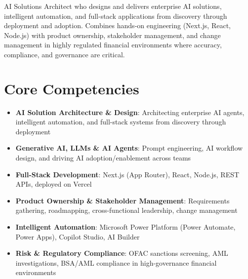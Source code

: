 \documentclass[11pt,a4paper,sans]{moderncv}
\begin{document}
\makecvtitle


\vspace{6pt}
\small{AI Solutions Architect who designs and delivers enterprise AI solutions, intelligent automation, and full-stack applications from discovery through deployment and adoption. Combines hands-on engineering (Next.js, React, Node.js) with product ownership, stakeholder management, and change management in highly regulated financial environments where accuracy, compliance, and governance are critical.}


\section{Core Competencies}
\vspace{1pt}
\begin{itemize}

\item \textbf{AI Solution Architecture \& Design}: Architecting enterprise AI agents, intelligent automation, and full-stack systems from discovery through deployment

\item \textbf{Generative AI, LLMs \& AI Agents}: Prompt engineering, AI workflow design, and driving AI adoption/enablement across teams

\item \textbf{Full-Stack Development}: Next.js (App Router), React, Node.js, REST APIs, deployed on Vercel

\item \textbf{Product Ownership \& Stakeholder Management}: Requirements gathering, roadmapping, cross-functional leadership, change management

\item \textbf{Intelligent Automation}: Microsoft Power Platform (Power Automate, Power Apps), Copilot Studio, AI Builder

\item \textbf{Risk \& Regulatory Compliance}: OFAC sanctions screening, AML investigations, BSA/AML compliance in high-governance financial environments

\end{itemize}
\end{document}
